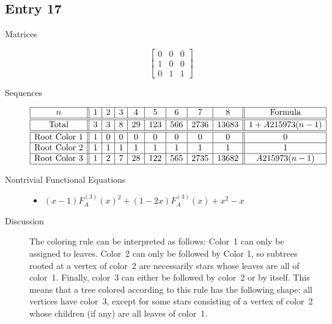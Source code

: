 \documentclass[12pt]{amsart}
\newcommand{\gff}[2]{F_{#2}^{(#1)}(x)}
\newcommand{\gfa}[1]{\gff{#1}{A}}
\begin{document}
\subsection*{Entry 17}
\begin{description}
    \item[Matrices]
    
    \[\begin{bmatrix}
0 & 0 & 0 \\
1 & 0 & 0 \\
0 & 1 & 1
\end{bmatrix}\]
    \item[Sequences]\hspace*{\fill}\vspace{-0.5cm}
    \begin{center}
        \[
        \begin{array}{|c||c|c|c|c|c|c|c|c||c|}\hline
           n  & 1 & 2 & 3 & 4 & 5 & 6 & 7 & 8  & \text{Formula}\\\hline\hline
           \text{Total}  & 3 & 3 & 8 & 29 & 123 & 566 & 2736 & 13683 & 1+A215973(n-1)\\\hline\hline
           \text{Root Color }1 & 1 & 0 & 0 & 0 & 0 & 0 & 0 & 0 & 0\\\hline
           \text{Root Color }2 & 1 & 1 & 1 & 1 & 1 & 1 & 1 & 1 & 1\\\hline
           \text{Root Color }3 & 1 & 2 & 7 & 28 & 122 & 565 & 2735 & 13682 & A215973(n-1)\\\hline
        \end{array}
        \]
    \end{center}
    
    \item[Nontrivial Functional Equations]\hspace*{\fill}

    \begin{itemize}
\item $(x - 1)\gfa{3}^2+(1 - 2x)\gfa{3}+x^2 - x$

\end{itemize}
    \item[Discussion] The coloring rule can be interpreted as follows: Color~1 can only be assigned to leaves. Color~2 can only be followed by Color 1, so subtrees rooted at a vertex of color~2 are necessarily stars whose leaves are all of color~1. Finally, color~3 can either be followed by color~2 or by itself. This means that a tree colored according to this rule has the following shape: all vertices have color~3, except for some stars consisting of a vertex of color~2 whose children (if any) are all leaves of color~1.


\end{description}
\end{document}
